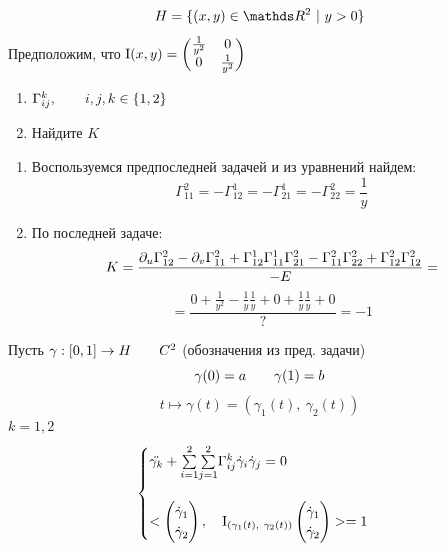 \documentclass[main]{subfiles}
\begin{document}

    \begin{Task}
        \[H = \{(x,y) \in \R^2 \ |\ y > 0\}\]
        Предположим, что $\RNumb{1}(x,y) = \begin{pmatrix}
            \frac{1}{y^2} & 0\\
            0 & \frac{1}{y^2}
        \end{pmatrix}$
        \begin{enumerate}
          \item $\Gamma_{ij}^k,\qquad i,j,k \in \{1,2\}$
          \item Найдите $K$
        \end{enumerate}
    \end{Task}

    \begin{sol}
        \begin{enumerate}
          \item Воспользуемся предпоследней задачей и из уравнений найдем:
          \[\Gamma_{11}^2 = - \Gamma_{12}^1 = -\Gamma_{21}^1 = -\Gamma_{22}^2 = \frac{1}{y}\]
          \item По последней задаче:
          \[K = \frac{\partial_u \Gamma_{12}^2 - \partial_v \Gamma_{11}^2 + \Gamma_{12}^1 \Gamma_{11}^1 \Gamma_{21}^2 - \Gamma_{11}^2 \Gamma_{22}^2 + \Gamma_{12}^2 \Gamma_{12}^2}{-E} =\]
          \[=\frac{0 + \frac{1}{y^2} - \frac{1}{y} \frac{1}{y} + 0 + \frac{1}{y} \frac{1}{y} + 0}{?} = -1\]
        \end{enumerate}
    \end{sol}

    \begin{task}
        Пусть $\gamma: [0,1] \rightarrow H \qquad C^2$ (обозначения из пред. задачи)
        \[\gamma(0) = a \qquad \gamma(1) = b\]
        \[t \mapsto \gamma(t) = (\gamma_1(t),\ \gamma_2(t))\]
        $k=1,2$
        \[\begin{cases}
          \ddot{\gamma_k} + \us{i=1}{\os{2}{\sum}} \us{j=1}{\os{2}{\sum}} \Gamma_{ij}^k \dot{\gamma}_i \dot{\gamma}_j = 0\\ \\
          <\begin{pmatrix}
            \dot{\gamma}_1\\
            \dot{\gamma}_2
          \end{pmatrix}, \q \RNumb{1}_{(\gamma_1(t),\ \gamma_2(t))} \begin{pmatrix}
            \dot{\gamma}_1\\
            \dot{\gamma}_2
          \end{pmatrix}> = 1
        \end{cases}\]
    \end{task}
\end{document}
